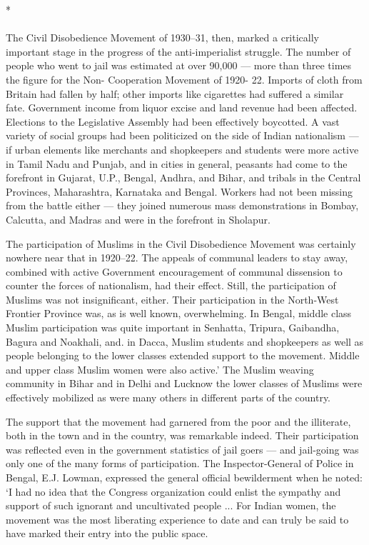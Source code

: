 \begin{center}*\end{center}

\paragraph*{}

The Civil Disobedience Movement of 1930--31, then, marked a critically important stage in the progress of the anti-imperialist struggle. The number of people who went to jail was estimated at over 90,000 --- more than three times the figure for the Non- Cooperation Movement of 1920- 22. Imports of cloth from Britain had fallen by half; other imports like cigarettes had suffered a similar fate. Government income from liquor excise and land revenue had been affected. Elections to the Legislative Assembly had been effectively boycotted. A vast variety of social groups had been politicized on the side of Indian nationalism --- if urban elements like merchants and shopkeepers and students were more active in Tamil Nadu and Punjab, and in cities in general, peasants had come to the forefront in Gujarat, U.P., Bengal, Andhra, and Bihar, and tribals in the Central Provinces, Maharashtra, Karnataka and Bengal. Workers had not been missing from the battle either --- they joined numerous mass demonstrations in Bombay, Calcutta, and Madras and were in the forefront in Sholapur.

The participation of Muslims in the Civil Disobedience Movement was certainly nowhere near that in 1920--22. The appeals of communal leaders to stay away, combined with active Government encouragement of communal dissension to counter the forces of nationalism, had their effect. Still, the participation of Muslims was not insignificant, either. Their participation in the North-West Frontier Province was, as is well known, overwhelming. In Bengal, middle class Muslim participation was quite important in Senhatta, Tripura, Gaibandha, Bagura and Noakhali, and. in Dacca, Muslim students and shopkeepers as well as people belonging to the lower classes extended support to the movement. Middle and upper class Muslim women were also active.' The Muslim weaving community in Bihar and in Delhi and Lucknow the lower classes of Muslims were effectively mobilized as were many others in different parts of the country.

The support that the movement had garnered from the poor and the illiterate, both in the town and in the country, was remarkable indeed. Their participation was reflected even in the government statistics of jail goers --- and jail-going was only one of the many forms of participation. The Inspector-General of Police in Bengal, E.J. Lowman, expressed the general official bewilderment when he noted: `I had no idea that the Congress organization could enlist the sympathy and support of such ignorant and uncultivated people ... For Indian women, the movement was the most liberating experience to date and can truly be said to have marked their entry into the public space.
